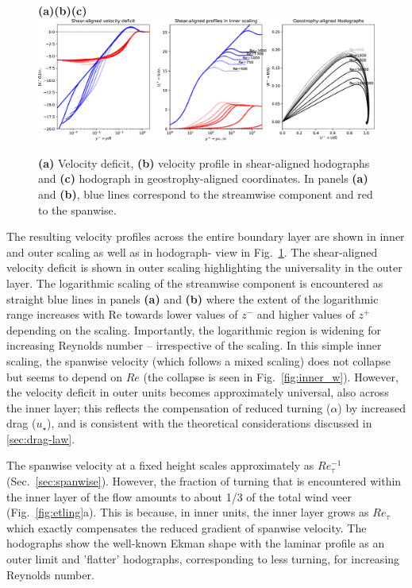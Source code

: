 \documentclass[smallcondensed,final]{svjour3}
\newcommand{\RE}{\mathrm{Re}}
\begin{document}
%
\begin{figure}
  \phantom{AAA}\textbf{(a)\hspace{0.3\textwidth}(b)\hspace{0.3\textwidth}(c)}\\
  \includegraphics[width=\textwidth]{Fig10.eps}  %
  \caption{ \textbf{(a)} Velocity deficit, \textbf{(b)} velocity profile in shear-aligned hodographs and \textbf{(c)} hodograph in geostrophy-aligned coordinates.
   In panels \textbf{(a)} and \textbf{(b)}, blue lines correspond to the streamwise component and red to the spanwise. }
  \label{fig:summary} 
\end{figure} 
The resulting velocity profiles across the entire boundary layer are shown in inner and outer scaling as well as in ho\-do\-graph- view in Fig.~\ref{fig:summary}. The shear-aligned velocity deficit is shown in outer scaling highlighting the universality in the outer layer. 
% 
The logarithmic scaling of the streamwise component is encountered as straight blue lines in panels \textbf{(a)} and \textbf{(b)} where 
the extent of the logarithmic range increases with $\RE$ towards lower values of $z^-$ and higher values of $z^+$ depending on the scaling. 
Importantly, the logarithmic region is widening for increasing Reynolds number -- irrespective of the scaling. 
% 
In this simple inner scaling, the spanwise velocity (which follows a mixed scaling) 
does not collapse but seems to depend on $Re$ (the collapse is seen in Fig.~\ref{fig:inner_w}).
% 
However, the velocity deficit in outer units becomes approximately universal, also across the inner layer; 
this reflects the compensation of reduced turning ($\alpha$) by increased drag ($u_\star$), 
and is consistent with the theoretical considerations discussed in \ref{sec:drag-law}. 
% 
\par
%
The spanwise velocity at a fixed height scales approximately as $Re_\tau^{-1}$ (Sec.~\ref{sec:spanwise}).
%
However, the fraction  of turning that is encountered within the inner layer of the flow amounts to about 1/3 of the total wind veer  (Fig.~\ref{fig:etling}a).  
%
This is because, in inner units, the inner layer grows as $Re_\tau$  which exactly compensates the reduced gradient of spanwise velocity. 
% 
The hodographs show the well-known Ekman shape with the laminar profile as an outer limit and 'flatter'  hodographs, corresponding to less turning, for increasing Reynolds number. 
\end{document}

